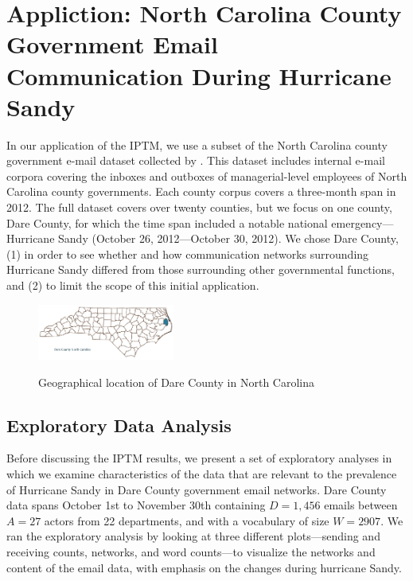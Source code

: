 \documentclass[a4paper]{article}
\begin{document}
 \section{Appliction: North Carolina County Government Email \\ Communication During Hurricane Sandy}  \label{sec: Application to North Carolina email data}
In our application of the IPTM, we use a subset of the North Carolina county government e-mail dataset collected by \citet{ben2017transparency}. This dataset includes internal e-mail corpora covering the inboxes and outboxes of managerial-level employees of North Carolina county governments. Each county corpus covers a three-month span in 2012. The full dataset covers over twenty counties, but we focus on one county, Dare County, for which the time span included a notable national emergency---Hurricane Sandy (October 26, 2012---October 30, 2012). We chose Dare County, (1) in order to see whether and how communication networks surrounding Hurricane Sandy differed from those surrounding other governmental functions, and (2) to limit the scope of this initial application.
  \begin{figure}[ht]
  	\centering
  	     	\includegraphics[width=0.4\textwidth]{plots/Dare.png} 
  	\label{fig:VanceDare}
  	\caption{Geographical location of Dare County in North Carolina}
  \end{figure}
 \subsection{Exploratory Data Analysis} \label{subsec: EDA}
 
Before discussing the IPTM results, we present a set of exploratory analyses in which we examine characteristics of the data that are relevant to the prevalence of Hurricane Sandy in Dare County government email networks. Dare County data spans October 1st to November 30th containing $D=1,456$ emails between $A=27$ actors from 22 departments, and with a vocabulary of size $W=2907$. We ran the exploratory analysis by looking at three different plots---sending and receiving counts, networks, and word counts---to visualize the networks and content of the email data, with emphasis on the changes during hurricane Sandy.
    
\end{document}
